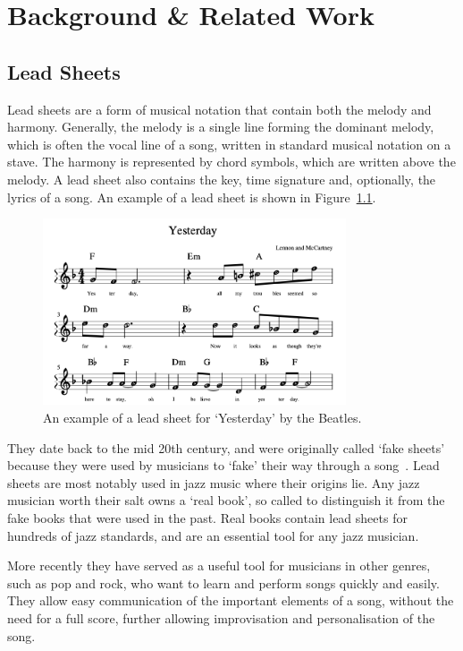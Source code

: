 


\chapter{Background \& Related Work}

\section{Lead Sheets}

Lead sheets are a form of musical notation that contain both the melody and harmony. Generally, the melody is a single line forming the dominant melody, which is often the vocal line of a song, written in standard musical notation on a stave. The harmony is represented by chord symbols, which are written above the melody. A lead sheet also contains the key, time signature and, optionally, the lyrics of a song. An example of a lead sheet is shown in Figure~\ref{fig:lead_sheet_example}.


\begin{figure}[h]
    \centering
    \includegraphics[width=0.8\textwidth]{images/lead_sheet_example.png}
    \caption{An example of a lead sheet for `Yesterday' by the Beatles.}
    \label{fig:lead_sheet_example}
\end{figure}

They date back to the mid 20th century, and were originally called `fake sheets' because they were used by musicians to `fake' their way through a song~\cite{RealBookPodcast}. Lead sheets are most notably used in jazz music where their origins lie. Any jazz musician worth their salt owns a `real book', so called to distinguish it from the fake books that were used in the past. Real books contain lead sheets for hundreds of jazz standards, and are an essential tool for any jazz musician. 

More recently they have served as a useful tool for musicians in other genres, such as pop and rock, who want to learn and perform songs quickly and easily. They allow easy communication of the important elements of a song, without the need for a full score, further allowing improvisation and personalisation of the song.

